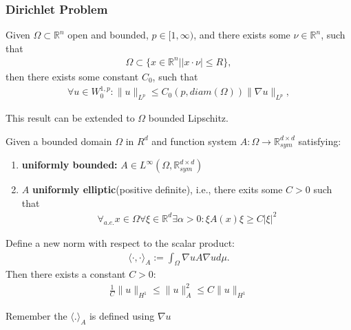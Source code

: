 \subsubsection{Dirichlet Problem}
\begin{lemma}
Given $\Omega \subset \mathbb{R}^n$ open and bounded, $p \in [1, \infty)$, and there exists some $\nu \in \mathbb{R}^n$, such that 
\begin{align*}
	\Omega \subset \{x \in \mathbb{R}^n| |x \cdot \nu| \le R\},
\end{align*}
then there exists some constant $C_0$, such that
\begin{align*}
	\forall u \in W_0^{1,p}: \|u\|_{L^p} \leq C_0(p, diam(\Omega)) \|\nabla u\|_{L^p},
\end{align*}
\end{lemma}
\begin{remark}
This result can be extended to $\Omega$ bounded Lipschitz. 	
\end{remark}


\begin{proposition}
	Given a bounded domain $\Omega$ in $R^d$ and function system $A : \Omega \rightarrow \mathbb{R}^{d \times d}_{sym}$ satisfying:
	\begin{enumerate}
		\item \textbf{uniformly bounded: }$A \in L^\infty(\Omega, \mathbb{R}^{d \times d}_{sym})$
		\item $A$ \textbf{uniformly elliptic}(positive definite), i.e., there exits some $C > 0$ such that
		\begin{align*}
			\forall_{a.e.} x \in \Omega \forall \xi \in \mathbb{R}^d \exists \alpha >0 : 
			\xi A(x)\xi \geq C|\xi|^2
		\end{align*}
	\end{enumerate}
	Define a new norm with respect to the scalar product:
	\begin{align*}
		\langle \cdot , \cdot \rangle_A:= \int_\Omega \nabla u A \nabla u d\mu.
	\end{align*}
	Then there exists a constant $C > 0$:
	\begin{align*}
		\frac{1}{C} \|u\|_{H^1} \leq \|u\|_A^2 \leq C \|u\|_{H^1} 
	\end{align*}
\end{proposition}
\begin{remark}
Remember the $\langle .\rangle_A$ is defined using $\nabla u$	
\end{remark}

